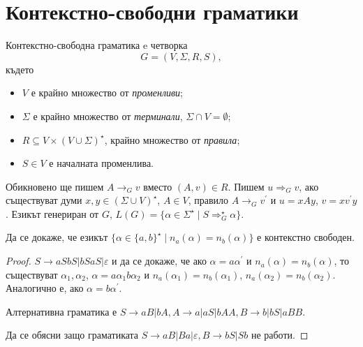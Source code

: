 \section{Контекстно-свободни граматики}
\begin{dfn}
  Контекстно-свободна граматика e четворка \[G = (V,\Sigma,R,S),\]
  където
  \begin{itemize}
  \item
    $V$ е крайно множество от {\em променливи};
  \item
    $\Sigma$ е крайно множество от {\em терминали}, $\Sigma \cap V = \emptyset$;
  \item
    $R \subseteq V\times (V\cup\Sigma)^\star$, крайно множество от {\em правила};
  \item
    $S \in V$ е началната променлива. 
  \end{itemize}
  Обикновено ще пишем $A \rightarrow_G v$ вместо $(A,v) \in R$.
  Пишем $u \Rightarrow_G v$, ако съществуват думи $x,y\in (\Sigma\cup V)^\star$, $A\in V$,
  правило $A\rightarrow_G v^\prime$ и $u = xAy$, $v = xv^\prime y$.
  Езикът генериран от $G$, $L(G) = \{\alpha\in\Sigma^\star\mid S \Rightarrow^\star_G \alpha\}$.
\end{dfn}

\begin{problem}
  Да се докаже, че езикът $\{\alpha \in \{a,b\}^\star\mid n_a(\alpha) = n_b(\alpha)\}$ 
  е контекстно свободен.
\end{problem}
\begin{proof}
  $S \rightarrow aSbS\vert bSaS \vert\varepsilon$  и да се докаже, че
  ако $\alpha = a\alpha^\prime$ и $n_a(\alpha) = n_b(\alpha)$,
  то съществуват $\alpha_1, \alpha_2$, $\alpha = a\alpha_1b\alpha_2$ и
  $n_a(\alpha_1) = n_b(\alpha_1)$, $n_a(\alpha_2) = n_b(\alpha_2)$.
  Аналогично е, ако $\alpha = b\alpha^\prime$.

  Алтернативна граматика е $S\rightarrow aB\vert bA, A\rightarrow a\vert aS\vert bAA, B\rightarrow b\vert bS\vert aBB$.
  
  Да се обясни защо граматиката $S\rightarrow aB\vert Ba\vert \varepsilon, B\rightarrow bS\vert Sb$ не работи.
\end{proof}

